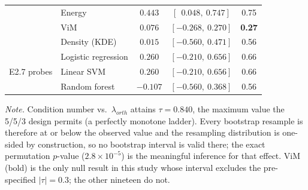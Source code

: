 \begin{table}[htbp]
\begin{tabular}{llccc}
& Energy                  & $0.443$  & $[\ \ 0.048,\ 0.747]$ & 0.75 \\
& ViM                     & $0.076$  & $[-0.268,\ 0.270]$ & \textbf{0.27} \\
& Density (KDE)           & $0.015$  & $[-0.560,\ 0.471]$ & 0.56 \\
\midrule
\multirow{3}{*}{E2.7 probes}
& Logistic regression     & $0.260$  & $[-0.210,\ 0.656]$ & 0.66 \\
& Linear SVM              & $0.260$  & $[-0.210,\ 0.656]$ & 0.66 \\
& Random forest           & $-0.107$ & $[-0.560,\ 0.368]$ & 0.56 \\
\bottomrule
\end{tabular}

\vspace{0.25cm}
\small \emph{Note.} Condition number vs.\ $\lambda_{orth}$ attains $\tau=0.840$, the maximum value the 5/5/3 design permits (a perfectly monotone ladder). Every bootstrap resample is therefore at or below the observed value and the resampling distribution is one-sided by construction, so no bootstrap interval is valid there; the exact permutation $p$-value ($2.8\times10^{-5}$) is the meaningful inference for that effect. ViM (bold) is the only null result in this study whose interval excludes the pre-specified $|\tau|=0.3$; the other nineteen do not.
\end{table}
